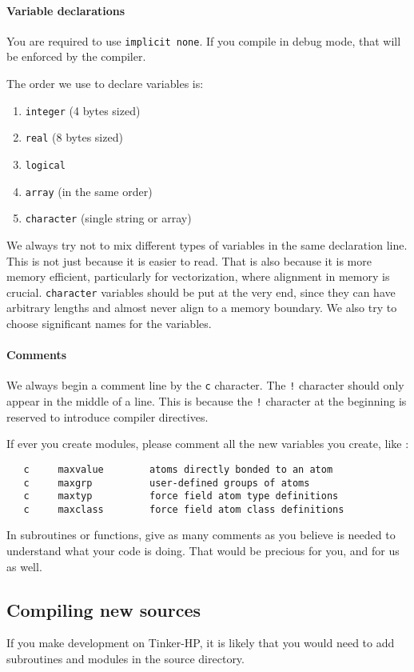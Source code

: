 \documentclass[peerreview]{IEEEtran}
\begin{document}
\paragraph{Variable declarations} You are required to use \texttt{implicit none}. If you compile in debug mode, that will be enforced by the compiler.

The order we use to declare variables is:
\begin{enumerate}
    \item \texttt{integer} (4 bytes sized)
    \item \texttt{real}    (8 bytes sized)
    \item \texttt{logical}
    \item \texttt{array} (in the same order)
    \item \texttt{character} (single string or array)
\end{enumerate}

We always try not to mix different types of variables in the same declaration line. This is not just because it is easier to read. That is also because it is more memory efficient, particularly for vectorization, where alignment in memory is crucial. \texttt{character} variables should be put at the very end, since they can have arbitrary lengths and almost never align to a memory boundary. We also try to choose significant names for the variables.

\paragraph{Comments} We always begin a comment line by the \texttt{c} character. The \texttt{!} character should only appear in the middle of a line.
This is because the \texttt{!} character at the beginning is reserved to introduce compiler directives.

If ever you create modules, please comment all the new variables you create, like :
\begin{verbatim}
   c     maxvalue        atoms directly bonded to an atom
   c     maxgrp          user-defined groups of atoms
   c     maxtyp          force field atom type definitions
   c     maxclass        force field atom class definitions
\end{verbatim}

In subroutines or functions, give as many comments as you believe is needed to understand what your code is doing. That would be precious for you, and for us as well. 
\subsection{Compiling new sources}
If you make development on Tinker-HP, it is likely that you would need to add subroutines and modules in the source directory.
\end{document}
